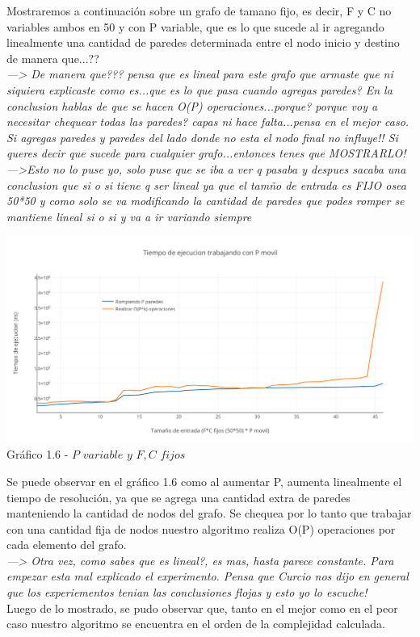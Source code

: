 Mostraremos a continuaci\'on sobre un grafo de tamano fijo, es decir, F y C no variables ambos en 50 y con P variable, que es lo que sucede al ir agregando linealmente una cantidad de paredes determinada entre el nodo inicio y destino de manera que...??\\

\textit{---> De manera que??? pensa que es lineal para este grafo que armaste que ni siquiera explicaste como es...que es lo que pasa cuando agregas paredes? En la conclusion hablas de que se hacen O(P) operaciones...porque? porque voy a necesitar chequear todas las paredes? capas ni hace falta...pensa en el mejor caso. Si agregas paredes y paredes del lado donde no esta el nodo final no influye!! Si queres decir que sucede para cualquier grafo...entonces tenes que MOSTRARLO!}\\

\textit{--->Esto no lo puse yo, solo puse que se iba a ver q pasaba y despues sacaba una conclusion que si o si tiene q ser lineal ya que el tamño de entrada es FIJO osea 50*50 y como solo se va modificando la cantidad de paredes que podes romper se mantiene lineal si o si y va a ir variando siempre}


\vspace*{0.3cm} \vspace*{0.3cm}
  \begin{center}
\includegraphics[scale=0.7]{./EJ1/pVariable.png}
{Gr\'afico 1.6 - $P$ $variable$ $y$ $F,C$ $fijos$}
  \end{center}
  \vspace*{0.3cm}

Se puede observar en el gr\'afico 1.6 como al aumentar P, aumenta linealmente el tiempo de resoluci\'on, ya que se agrega una cantidad extra de paredes manteniendo la cantidad de nodos del grafo. Se chequea por lo tanto que trabajar con una cantidad fija de nodos nuestro algoritmo realiza O(P) operaciones por cada elemento del grafo.\\

\textit{---> Otra vez, como sabes que es lineal?, es mas, hasta parece constante. Para empezar esta mal explicado el experimento. Pensa que Curcio nos dijo en general que los experiementos tenian las conclusiones flojas y esto yo lo escuche!}\\

Luego de lo mostrado, se pudo observar que, tanto en el mejor como en el peor caso nuestro algoritmo se encuentra en el orden de la complejidad calculada.
